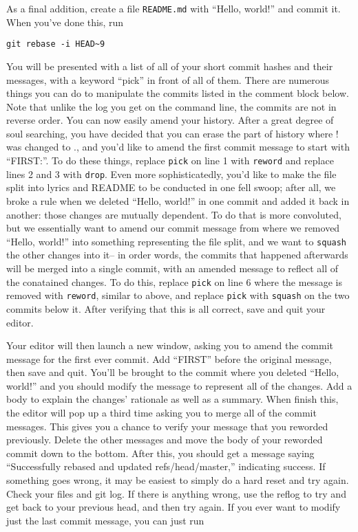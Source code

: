 {\par{
As a final addition, create a file \verb+README.md+ with ``Hello, world!'' and
commit it. When you've done this, run 
}

\begin{verbatim}
git rebase -i HEAD~9
\end{verbatim}

\par{
You will be presented with a list of all of your short commit hashes and their
messages, with a keyword ``pick'' in front of all of them. There are numerous
things you can do to manipulate the commits listed in the comment block below.
Note that unlike the log you get on the command line, the commits are not in
reverse order. You can now easily amend your history. After a great degree of
soul searching, you have decided that you can erase the part of history where
! was changed to ., and you'd like to amend the first commit message to start
with ``FIRST:''. To do these things, replace \verb+pick+ on line 1 with
\verb+reword+ and replace lines 2 and 3 with \verb+drop+. Even more
sophisticatedly, you'd like to make the file split into lyrics and README to
be conducted in one fell swoop; after all, we broke a rule when we deleted
``Hello, world!'' in one commit and added it back in another: those changes
are mutually dependent. To do that is more convoluted, but we essentially
want to amend our commit message from where we removed ``Hello, world!'' into
something representing the file split, and we want to \verb+squash+ the other
changes into it-- in order words, the commits that happened afterwards will be
merged into a single commit, with an amended message to reflect all of the
conatained changes. To do this, replace \verb+pick+ on line 6 where the
message is removed with \verb+reword+, similar to above, and replace
\verb+pick+ with \verb+squash+ on the two commits below it. After verifying
that this is all correct, save and quit your editor.
}

\par{
Your editor will then launch a new window, asking you to amend the commit
message for the first ever commit. Add ``FIRST'' before the original message,
then save and quit. You'll be brought to the commit where you deleted ``Hello,
world!'' and you should modify the message to represent all of the changes.
Add a body to explain the changes' rationale as well as a summary. When finish
this, the editor will pop up a third time asking you to merge all of the
commit messages. This gives you a chance to verify your message that you
reworded previously. Delete the other messages and move the body of your
reworded commit down to the bottom. After this, you should get a message
saying ``Successfully rebased and updated refs/head/master,'' indicating
success. If something goes wrong, it may be easiest to simply do a hard reset
and try again. Check your files and git log. If there is anything wrong, use
the reflog to try and get back to your previous head, and then try again.
If you ever want to modify just the last commit message, you can just run
}

}
